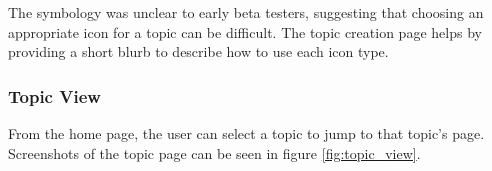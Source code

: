       The symbology was unclear to early beta testers,
      suggesting that choosing an appropriate icon for a topic can be difficult.
      The topic creation page helps by providing
      a short blurb to describe how to use each icon type.

      \subsubsection{Topic View}
      From the home page,
      the user can select a topic to jump to that topic's page.
      Screenshots of the topic page can be seen in figure \ref{fig:topic_view}.

    \begin{figure}
      \caption{\textbf{Topic View} --
          Topic views show the topic's current status icon,
          controls available to the user,
          and messages that have been left under that topic.
          (a) If you own a topic, you can adjust its status.
          (b) On someone else's topic, you can leave a smile.
          (c) You can see only your own archived topics,
          and you can bring them back from the archive
          and read the messages attached to it.}
      \centering
      \begin{subfigure}[b]{0.3\textwidth}

\end{subfigure}
\end{figure}
